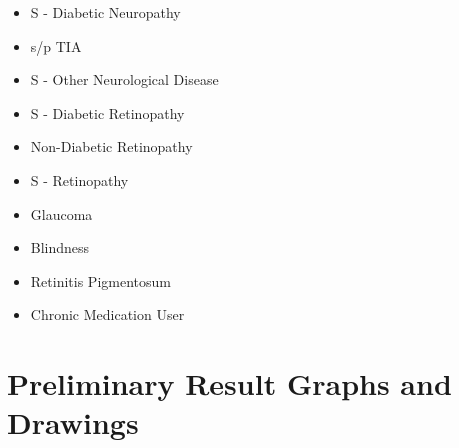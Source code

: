 \documentclass[a4paper,12pt]{article}
\begin{document}
\begin{appendices}
\begin{itemize}
   			\item S - Diabetic Neuropathy
   			\item s/p TIA
   			\item S - Other Neurological Disease
   			\item S - Diabetic Retinopathy
   			\item Non-Diabetic Retinopathy
   			\item S - Retinopathy
   			\item Glaucoma
   			\item Blindness
   			\item Retinitis Pigmentosum
   			\item Chronic Medication User
   		\end{itemize}
   		\newpage
   		
   		\section{Preliminary Result Graphs and Drawings}

\end{appendices}
\end{document}
